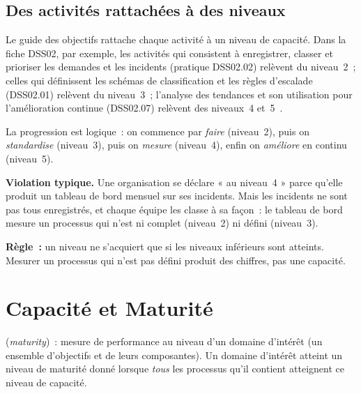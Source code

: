 \subsection{Des activités rattachées à des niveaux}

Le guide des objectifs rattache chaque activité à un niveau de capacité.
Dans la fiche DSS02, par exemple, les activités qui consistent à
enregistrer, classer et prioriser les demandes et les incidents
(pratique DSS02.02) relèvent du niveau~2~; celles qui définissent les
schémas de classification et les règles d'escalade (DSS02.01) relèvent du
niveau~3~; l'analyse des tendances et son utilisation pour l'amélioration
continue (DSS02.07) relèvent des niveaux~4 et~5~\cite{isaca2018cobitobjectifs}.

La progression est logique~: on commence par \emph{faire} (niveau~2),
puis on \emph{standardise} (niveau~3), puis on \emph{mesure} (niveau~4),
enfin on \emph{améliore} en continu (niveau~5).

\begin{boxalert}
\textbf{Violation typique.} Une organisation se déclare « au niveau~4 »
parce qu'elle produit un tableau de bord mensuel sur ses incidents. Mais
les incidents ne sont pas tous enregistrés, et chaque équipe les classe à
sa façon~: le tableau de bord mesure un processus qui n'est ni complet
(niveau~2) ni défini (niveau~3).

\smallskip
\textbf{Règle~:} un niveau ne s'acquiert que si les niveaux inférieurs
sont atteints. Mesurer un processus qui n'est pas défini produit des
chiffres, pas une capacité.
\end{boxalert}

\section{Capacité et Maturité}
\label{sec:c08-maturite}

\begin{boxdef}
 (\textit{maturity})~: mesure de
performance au niveau d'un domaine d'intérêt (un ensemble d'objectifs et
de leurs composantes). Un domaine d'intérêt atteint un niveau de maturité
donné lorsque \emph{tous} les processus qu'il contient atteignent ce
niveau de capacité.
\end{boxdef}

